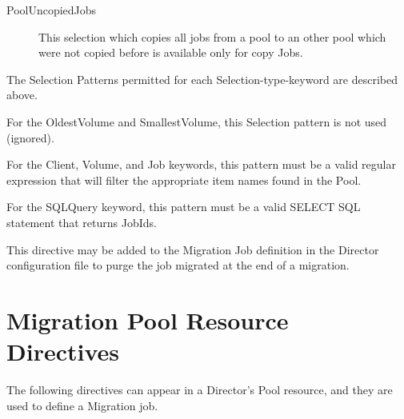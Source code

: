 \begin{description}
\begin{description}
  \item [PoolUncopiedJobs] This selection which copies all jobs from a pool
        to an other pool which were not copied before is available only for copy Jobs.

  \end{description}


  The Selection Patterns permitted for each Selection-type-keyword are
  described above.

  For the OldestVolume and SmallestVolume, this
  Selection pattern is not used (ignored).

  For the Client, Volume, and Job
  keywords, this pattern must be a valid regular expression that will filter
  the appropriate item names found in the Pool.

  For the SQLQuery keyword, this pattern must be a valid SELECT SQL statement
  that returns JobIds.

  This directive may be added to the Migration Job definition in the Director
  configuration file to purge the job migrated at the end of a migration.

\end{description}

\section{Migration Pool Resource Directives}

The following directives can appear in a Director's Pool resource, and they
are used to define a Migration job.

